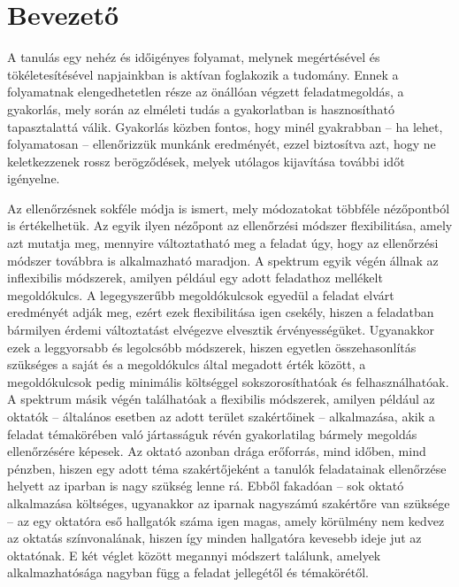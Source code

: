 \chapter{Bevezető}

A tanulás egy nehéz és időigényes folyamat, melynek megértésével és tökéletesítésével napjainkban is aktívan foglakozik a tudomány.
Ennek a folyamatnak elengedhetetlen része az önállóan végzett feladatmegoldás, a gyakorlás, mely során az elméleti tudás a gyakorlatban is hasznosítható tapasztalattá válik.
Gyakorlás közben fontos, hogy minél gyakrabban -- ha lehet, folyamatosan -- ellenőrizzük munkánk eredményét, ezzel biztosítva azt, hogy ne keletkezzenek rossz berögződések, melyek utólagos kijavítása további időt igényelne.

Az ellenőrzésnek sokféle módja is ismert, mely módozatokat többféle nézőpontból is értékelhetük.
Az egyik ilyen nézőpont az ellenőrzési módszer flexibilitása, amely azt mutatja meg, mennyire változtatható meg a feladat úgy, hogy az ellenőrzési módszer továbbra is alkalmazható maradjon.
A spektrum egyik végén állnak az inflexibilis módszerek, amilyen például egy adott feladathoz mellékelt megoldókulcs.
A legegyszerűbb megoldókulcsok egyedül a feladat elvárt eredményét adják meg, ezért ezek flexibilitása igen csekély, hiszen a feladatban bármilyen érdemi változtatást elvégezve elvesztik érvényességüket. 
Ugyanakkor ezek a leggyorsabb és legolcsóbb módszerek, hiszen egyetlen összehasonlítás szükséges a saját és a megoldókulcs által megadott érték között, a megoldókulcsok pedig minimális költséggel sokszorosíthatóak és felhasználhatóak.
A spektrum másik végén találhatóak a flexibilis módszerek, amilyen például az oktatók -- általános esetben az adott terület szakértőinek -- alkalmazása, akik a feladat témakörében való jártasságuk révén gyakorlatilag bármely megoldás ellenőrzésére képesek.
Az oktató azonban drága erőforrás, mind időben, mind pénzben, hiszen egy adott téma szakértőjeként a tanulók feladatainak ellenőrzése helyett az iparban is nagy szükség lenne rá.
Ebből fakadóan -- sok oktató alkalmazása költséges, ugyanakkor az iparnak nagyszámú szakértőre van szüksége -- az egy oktatóra eső hallgatók száma igen magas, amely körülmény nem kedvez az oktatás színvonalának, hiszen így minden hallgatóra kevesebb ideje jut az oktatónak.
E két véglet között megannyi módszert találunk, amelyek alkalmazhatósága nagyban függ a feladat jellegétől és témakörétől.

